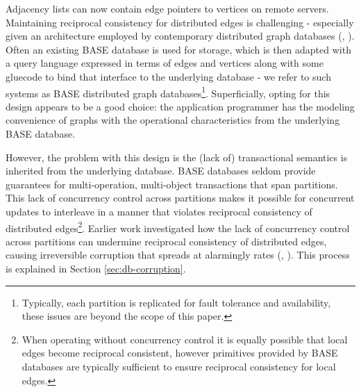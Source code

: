 \documentclass[sigplan,10pt]{acmart}
\begin{document}
Adjacency lists can now contain edge pointers to vertices on remote servers. Maintaining reciprocal consistency for distributed edges is challenging - especially given an architecture employed by contemporary distributed graph databases (\cite{janusgraph}, \cite{TitanDB}). Often an existing BASE database is used for storage, which is then adapted with a query language expressed in terms of edges and vertices along with some gluecode to bind that interface to the underlying database - we refer to such systems as BASE distributed graph databases\footnote{Typically, each partition is replicated for fault tolerance and availability, these issues are beyond the scope of this paper.}. Superficially, opting for this design appears to be a good choice: the application programmer has the modeling convenience of graphs with the operational characteristics from the underlying BASE database.

However, the problem with this design is the (lack of) transactional semantics is inherited from the underlying database. BASE databases seldom provide guarantees for multi-operation, multi-object transactions that span partitions. This lack of concurrency control across partitions makes it possible for concurrent updates to interleave in a manner that violates reciprocal consistency of distributed edges\footnote{When operating without concurrency control it is equally possible that local edges become reciprocal consistent, however primitives provided by BASE databases are typically sufficient to ensure reciprocal consistency for local edges.}. Earlier work investigated how the lack of concurrency control across partitions can undermine reciprocal consistency of distributed edges, causing irreversible corruption that spreads at alarmingly rates (\cite{Ezhilchelvan2018}, \cite{Webber2019}). This process is explained in Section \ref{sec:db-corruption}.
\end{document}
